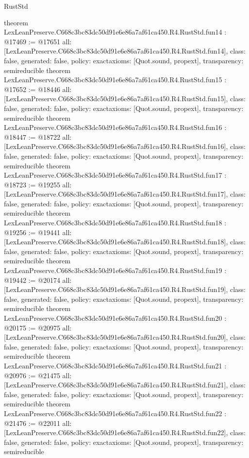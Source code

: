 \begin{lexlean}{RustStd}
\begin{coremodule}
{}
theorem LexLeanPreserve.C668c3bc83dc50d91e6e86a7af61ca450.R4.RustStd.fun14 : @17469 := @17651 {
  all: [LexLeanPreserve.C668c3bc83dc50d91e6e86a7af61ca450.R4.RustStd.fun14],
  class: false,
  generated: false,
  policy: exact{axioms: [Quot.sound, propext]},
  transparency: semireducible
}
theorem LexLeanPreserve.C668c3bc83dc50d91e6e86a7af61ca450.R4.RustStd.fun15 : @17652 := @18446 {
  all: [LexLeanPreserve.C668c3bc83dc50d91e6e86a7af61ca450.R4.RustStd.fun15],
  class: false,
  generated: false,
  policy: exact{axioms: [Quot.sound, propext]},
  transparency: semireducible
}
theorem LexLeanPreserve.C668c3bc83dc50d91e6e86a7af61ca450.R4.RustStd.fun16 : @18447 := @18722 {
  all: [LexLeanPreserve.C668c3bc83dc50d91e6e86a7af61ca450.R4.RustStd.fun16],
  class: false,
  generated: false,
  policy: exact{axioms: [Quot.sound, propext]},
  transparency: semireducible
}
theorem LexLeanPreserve.C668c3bc83dc50d91e6e86a7af61ca450.R4.RustStd.fun17 : @18723 := @19255 {
  all: [LexLeanPreserve.C668c3bc83dc50d91e6e86a7af61ca450.R4.RustStd.fun17],
  class: false,
  generated: false,
  policy: exact{axioms: [Quot.sound, propext]},
  transparency: semireducible
}
theorem LexLeanPreserve.C668c3bc83dc50d91e6e86a7af61ca450.R4.RustStd.fun18 : @19256 := @19441 {
  all: [LexLeanPreserve.C668c3bc83dc50d91e6e86a7af61ca450.R4.RustStd.fun18],
  class: false,
  generated: false,
  policy: exact{axioms: [Quot.sound, propext]},
  transparency: semireducible
}
theorem LexLeanPreserve.C668c3bc83dc50d91e6e86a7af61ca450.R4.RustStd.fun19 : @19442 := @20174 {
  all: [LexLeanPreserve.C668c3bc83dc50d91e6e86a7af61ca450.R4.RustStd.fun19],
  class: false,
  generated: false,
  policy: exact{axioms: [Quot.sound, propext]},
  transparency: semireducible
}
theorem LexLeanPreserve.C668c3bc83dc50d91e6e86a7af61ca450.R4.RustStd.fun20 : @20175 := @20975 {
  all: [LexLeanPreserve.C668c3bc83dc50d91e6e86a7af61ca450.R4.RustStd.fun20],
  class: false,
  generated: false,
  policy: exact{axioms: [Quot.sound, propext]},
  transparency: semireducible
}
theorem LexLeanPreserve.C668c3bc83dc50d91e6e86a7af61ca450.R4.RustStd.fun21 : @20976 := @21475 {
  all: [LexLeanPreserve.C668c3bc83dc50d91e6e86a7af61ca450.R4.RustStd.fun21],
  class: false,
  generated: false,
  policy: exact{axioms: [Quot.sound, propext]},
  transparency: semireducible
}
theorem LexLeanPreserve.C668c3bc83dc50d91e6e86a7af61ca450.R4.RustStd.fun22 : @21476 := @22011 {
  all: [LexLeanPreserve.C668c3bc83dc50d91e6e86a7af61ca450.R4.RustStd.fun22],
  class: false,
  generated: false,
  policy: exact{axioms: [Quot.sound, propext]},
  transparency: semireducible
}
\end{coremodule}
\end{lexlean}
